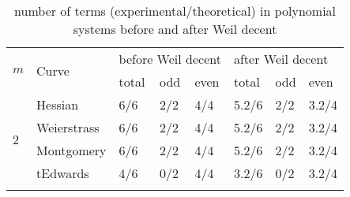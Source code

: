 
\begin{table}[!h]
\centering
\caption{number of terms (experimental/theoretical) in polynomial systems before and after Weil decent}
\label{tb:terms}
\begin{tabular}{llllllll}
\hline
\multicolumn{1}{|l|}{\multirow{2}{*}{$m$}} & \multicolumn{1}{l|}{\multirow{2}{*}{Curve}} & \multicolumn{3}{l|}{before Weil decent}                                                    & \multicolumn{3}{l|}{after Weil decent}                                                           \\ \cline{3-8} 
\multicolumn{1}{|l|}{}                     & \multicolumn{1}{l|}{}                       & \multicolumn{1}{l|}{total}   & \multicolumn{1}{l|}{odd}     & \multicolumn{1}{l|}{even}    & \multicolumn{1}{l|}{total}     & \multicolumn{1}{l|}{odd}       & \multicolumn{1}{l|}{even}      \\ \hline
\multicolumn{1}{|l|}{\multirow{4}{*}{2}}   & \multicolumn{1}{l|}{Hessian}                & \multicolumn{1}{l|}{6/6}     & \multicolumn{1}{l|}{2/2}     & \multicolumn{1}{l|}{4/4}     & \multicolumn{1}{l|}{5.2/6}     & \multicolumn{1}{l|}{2/2}       & \multicolumn{1}{l|}{3.2/4}     \\ \cline{2-8} 
\multicolumn{1}{|l|}{}                     & \multicolumn{1}{l|}{Weierstrass}            & \multicolumn{1}{l|}{6/6}     & \multicolumn{1}{l|}{2/2}     & \multicolumn{1}{l|}{4/4}     & \multicolumn{1}{l|}{5.2/6}     & \multicolumn{1}{l|}{2/2}       & \multicolumn{1}{l|}{3.2/4}     \\ \cline{2-8} 
\multicolumn{1}{|l|}{}                     & \multicolumn{1}{l|}{Montgomery}             & \multicolumn{1}{l|}{6/6}     & \multicolumn{1}{l|}{2/2}     & \multicolumn{1}{l|}{4/4}     & \multicolumn{1}{l|}{5.2/6}     & \multicolumn{1}{l|}{2/2}       & \multicolumn{1}{l|}{3.2/4}     \\ \cline{2-8} 
\multicolumn{1}{|l|}{}                     & \multicolumn{1}{l|}{tEdwards}               & \multicolumn{1}{l|}{4/6}     & \multicolumn{1}{l|}{0/2}     & \multicolumn{1}{l|}{4/4}     & \multicolumn{1}{l|}{3.2/6}     & \multicolumn{1}{l|}{0/2}       & \multicolumn{1}{l|}{3.2/4}     \\ \hline \vspace{-3mm}
                                           &                                             &                              &                              &                              &                                &                                &                                \\ \hline

\end{tabular}
\end{table}
